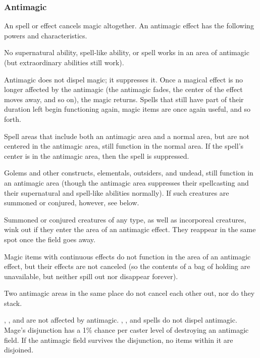\subsubsection{Antimagic}
An  spell or effect cancels magic altogether. An antimagic effect has the following powers and characteristics.

\begin{itemize*}
\item No supernatural ability, spell-like ability, or spell works in an area of antimagic (but extraordinary abilities still work).
\item Antimagic does not dispel magic; it suppresses it. Once a magical effect is no longer affected by the antimagic (the antimagic fades, the center of the effect moves away, and so on), the magic returns. Spells that still have part of their duration left begin functioning again, magic items are once again useful, and so forth.
\item Spell areas that include both an antimagic area and a normal area, but are not centered in the antimagic area, still function in the normal area. If the spell's center is in the antimagic area, then the spell is suppressed.
\item Golems and other constructs, elementals, outsiders, and undead, still function in an antimagic area (though the antimagic area suppresses their spellcasting and their supernatural and spell-like abilities normally). If such creatures are summoned or conjured, however, see below.
\item Summoned or conjured creatures of any type, as well as incorporeal creatures, wink out if they enter the area of an antimagic effect. They reappear in the same spot once the field goes away.
\item Magic items with continuous effects do not function in the area of an antimagic effect, but their effects are not canceled (so the contents of a bag of holding are unavailable, but neither spill out nor disappear forever).
\item Two antimagic areas in the same place do not cancel each other out, nor do they stack.
\item {}, , and  are not affected by antimagic. , , and  spells do not dispel antimagic. Mage's disjunction has a 1\% chance per caster level of destroying an antimagic field. If the antimagic field survives the disjunction, no items within it are disjoined.
\end{itemize*}

